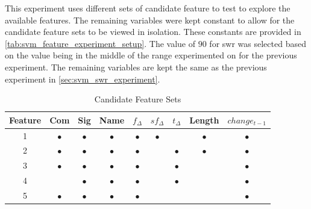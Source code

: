 

This experiment uses different sets of candidate feature to test to explore the available features. The remaining variables were kept constant to allow for the candidate feature sets to be viewed in isolation. These constants are provided in \autoref{tab:svm_feature_experiment_setup}. The value of $90$ for \gls{swr} was selected based on the value being in the middle of the range experimented on for the previous experiment. The remaining variables are kept the same as the previous experiment in \autoref{sec:svm_swr_experiment}. 

\begin{table}[ht]
\begin{center}

    \begin{tabular}{|c|c|c|c|c|c|c|c|c|}
        \hline
        Feature & Com & Sig & Name & $f_{\Delta}$ & $sf_{\Delta}$ & $t_\Delta$ & Length & $change_{t-1}$ \\
         \hline
        1 & $\bullet$ & $\bullet$ & $\bullet$ & $\bullet$ & $\bullet$ & & $\bullet$ & $\bullet$ \\
        2 & $\bullet$ & $\bullet$ & $\bullet$ & $\bullet$ & & $\bullet$ & $\bullet$ & $\bullet$ \\
        3 & $\bullet$ & $\bullet$ & $\bullet$ & $\bullet$ & & $\bullet$ & & $\bullet$ \\
        4 & & $\bullet$ & $\bullet$ & $\bullet$ & & $\bullet$ & & $\bullet$ \\
        5 & $\bullet$ & $\bullet$ & $\bullet$ & $\bullet$ & & & & $\bullet$ \\ \hline
    \end{tabular}
    \caption{Candidate Feature Sets}
    \label{tab:svm_feature_experiment_sets}
\end{center}
\end{table}

